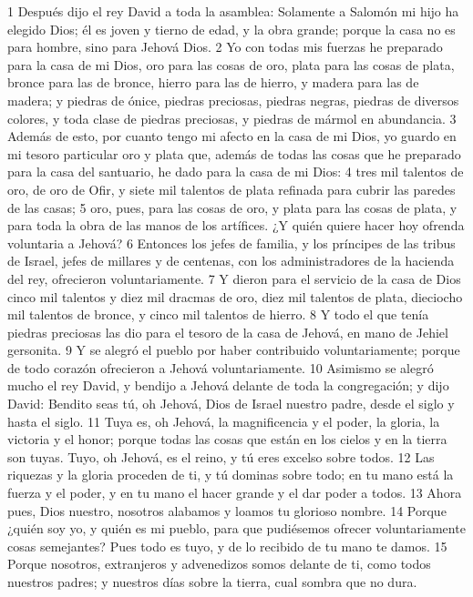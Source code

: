1 Después dijo el rey David a toda la asamblea: Solamente a Salomón mi hijo ha elegido Dios; él es joven y tierno de edad, y la obra grande; porque la casa no es para hombre, sino para Jehová Dios.
2 Yo con todas mis fuerzas he preparado para la casa de mi Dios, oro para las cosas de oro, plata para las cosas de plata, bronce para las de bronce, hierro para las de hierro, y madera para las de madera; y piedras de ónice, piedras preciosas, piedras negras, piedras de diversos colores, y toda clase de piedras preciosas, y piedras de mármol en abundancia. 
3 Además de esto, por cuanto tengo mi afecto en la casa de mi Dios, yo guardo en mi tesoro particular oro y plata que, además de todas las cosas que he preparado para la casa del santuario, he dado para la casa de mi Dios:
4 tres mil talentos de oro,  de oro de Ofir, y siete mil talentos de plata refinada para cubrir las paredes de las casas;
5 oro, pues, para las cosas de oro, y plata para las cosas de plata, y para toda la obra de las manos de los artífices. ¿Y quién quiere hacer hoy ofrenda voluntaria a Jehová?
6 Entonces los jefes de familia, y los príncipes de las tribus de Israel, jefes de millares y de centenas, con los administradores de la hacienda del rey, ofrecieron voluntariamente.
7 Y dieron para el servicio de la casa de Dios cinco mil talentos   y diez mil dracmas de oro, diez mil talentos de plata, dieciocho mil talentos de bronce, y cinco mil talentos de hierro.
8 Y todo el que tenía piedras preciosas las dio para el tesoro de la casa de Jehová, en mano de Jehiel gersonita.
9 Y se alegró el pueblo por haber contribuido voluntariamente; porque de todo corazón ofrecieron a Jehová voluntariamente.
10 Asimismo se alegró mucho el rey David, y bendijo a Jehová delante de toda la congregación; y dijo David: Bendito seas tú, oh Jehová, Dios de Israel nuestro padre, desde el siglo y hasta el siglo.
11 Tuya es, oh Jehová, la magnificencia y el poder, la gloria, la victoria y el honor; porque todas las cosas que están en los cielos y en la tierra son tuyas. Tuyo, oh Jehová, es el reino, y tú eres excelso sobre todos.
12 Las riquezas y la gloria proceden de ti, y tú dominas sobre todo; en tu mano está la fuerza y el poder, y en tu mano el hacer grande y el dar poder a todos.
13 Ahora pues, Dios nuestro, nosotros alabamos y loamos tu glorioso nombre.
14 Porque ¿quién soy yo, y quién es mi pueblo, para que pudiésemos ofrecer voluntariamente cosas semejantes? Pues todo es tuyo, y de lo recibido de tu mano te damos.
15 Porque nosotros, extranjeros y advenedizos somos delante de ti, como todos nuestros padres; y nuestros días sobre la tierra, cual sombra que no dura.
